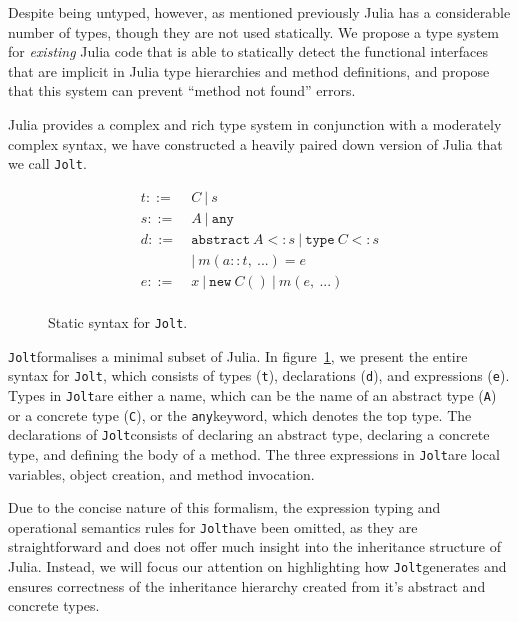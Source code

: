 \documentclass[preprint]{sigplanconf}
\newcommand{\xt}[1]{\texttt{#1}}
\newcommand{\abstype}[2]{\xt{abstract}~#1 <: #2}
\newcommand{\oftype}[2]{#1::#2}
\newcommand{\m}[2]{{#1}(#2)}
\newcommand{\contype}[2]{\xt{type}~#1 <: #2}
\newcommand{\any}{\xt{any}}
\newcommand{\jolt}{\xt{Jolt}}
\renewcommand{\ldots}{...}
\begin{document}
Despite being untyped, however, as mentioned previously Julia has a considerable
number of types, though they are not used statically. We propose a type system
for \emph{existing} Julia code that is able to statically detect the functional
interfaces that are implicit in Julia type hierarchies and method definitions,
and propose that this system can prevent ``method not found'' errors.

Julia provides a complex and rich type system in conjunction with a moderately
complex syntax, we have constructed a heavily paired down version of Julia that we call \jolt.

\begin{figure}
\begin{align*}
t ::=~&  C ~|~ s\\
s ::=~& A ~|~ \any\\
d ::=~& \abstype{A}{s} ~|~ \contype{C}{s} \\
  & |~ \m{m}{\oftype{a}{t}, ~\ldots} = e\\
e ::=~& x ~|~ \xt{new} ~ C() ~|~ m(e,~\ldots) \\
\end{align*}
\caption{Static syntax for \jolt.}
\label{fm:syntax}
\end{figure}

\jolt\space formalises a minimal subset of Julia. In figure~\ref{fm:syntax}, we present the entire
syntax for \jolt, which consists of types (\xt{t}), declarations (\xt{d}), and expressions (\xt{e}). 
Types in \jolt\space are either a name, which can be the name of an abstract type (\xt{A}) or a concrete type (\xt{C}), 
or the \any\space keyword, which denotes the top type. The declarations 
of \jolt\space consists of declaring an abstract type, declaring a concrete type, and defining the body of a method.
The three expressions in \jolt\space are local variables, object creation, and method invocation. 

Due to the concise nature of this formalism, the expression typing and operational semantics rules for \jolt have
been omitted, as they are straightforward and does not offer much insight into the inheritance structure of Julia. 
Instead, we will focus our attention on highlighting how \jolt\space generates and ensures correctness of the inheritance
hierarchy created from it's abstract and concrete types. 
\end{document}
